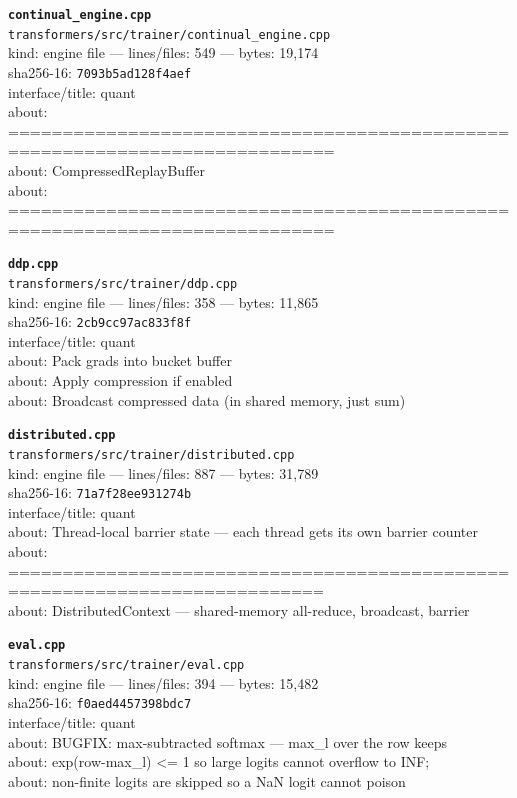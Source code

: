 \noindent\textbf{\texttt{continual\_engine.cpp}}\\
\texttt{transformers/src/trainer/continual\_engine.cpp}\\
kind: engine file --- lines/files: 549 --- bytes: 19,174\\
sha256-16: \texttt{7093b5ad128f4aef}\\
interface/title: quant\\
about: ============================================================================\\
about: CompressedReplayBuffer\\
about: ============================================================================\\
\vspace*{6.0pt}

\noindent\textbf{\texttt{ddp.cpp}}\\
\texttt{transformers/src/trainer/ddp.cpp}\\
kind: engine file --- lines/files: 358 --- bytes: 11,865\\
sha256-16: \texttt{2cb9cc97ac833f8f}\\
interface/title: quant\\
about: Pack grads into bucket buffer\\
about: Apply compression if enabled\\
about: Broadcast compressed data (in shared memory, just sum)\\
\vspace*{6.0pt}

\noindent\textbf{\texttt{distributed.cpp}}\\
\texttt{transformers/src/trainer/distributed.cpp}\\
kind: engine file --- lines/files: 887 --- bytes: 31,789\\
sha256-16: \texttt{71a7f28ee931274b}\\
interface/title: quant\\
about: Thread-local barrier state — each thread gets its own barrier counter\\
about: ===========================================================================\\
about: DistributedContext — shared-memory all-reduce, broadcast, barrier\\
\vspace*{6.0pt}

\noindent\textbf{\texttt{eval.cpp}}\\
\texttt{transformers/src/trainer/eval.cpp}\\
kind: engine file --- lines/files: 394 --- bytes: 15,482\\
sha256-16: \texttt{f0aed4457398bdc7}\\
interface/title: quant\\
about: BUGFIX: max-subtracted softmax — max\_l over the row keeps\\
about: exp(row-max\_l) <= 1 so large logits cannot overflow to INF;\\
about: non-finite logits are skipped so a NaN logit cannot poison\\
\vspace*{6.0pt}
\newpage

